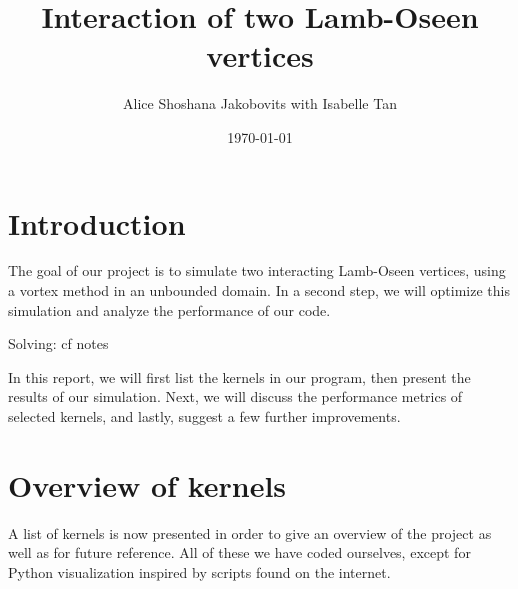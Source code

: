 \documentclass[a4paper,12pt,twoside]{article}
\begin{document}
\title{Interaction of two Lamb-Oseen vertices
\\ }
\date{\today}
\author{Alice Shoshana Jakobovits {\small with Isabelle Tan}}
\maketitle
\tableofcontents %

\baselineskip=16pt
\parindent=15pt
\parskip=5pt

\newpage

\section{Introduction} \label{sec:intro}

The goal of our project is to simulate two interacting Lamb-Oseen vertices, using a vortex method in an unbounded domain. In a second step, we will optimize this simulation and analyze the performance of our code.

Solving: cf notes 
	
In this report, we will first list the kernels in our program, then present the results of our simulation. Next, we will discuss the performance metrics of selected kernels, and lastly, suggest a few further improvements.

\section{Overview of kernels} \label{sec:overviewkernels}

A list of kernels is now presented in order to give an overview of the project as well as for future reference. All of these we have coded ourselves, except for Python visualization inspired by scripts found on the internet. 
\end{document}
